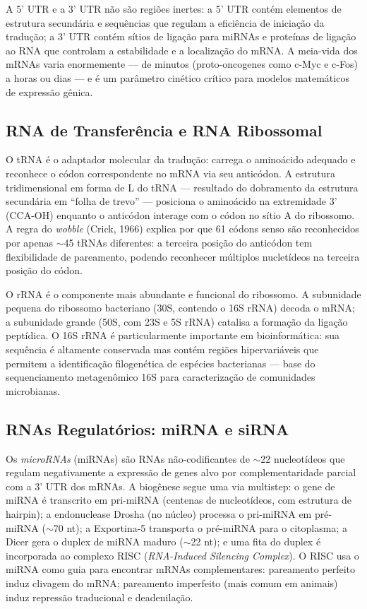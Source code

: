 A 5' UTR e a 3' UTR não são regiões inertes: a 5' UTR contém elementos de estrutura
secundária e sequências que regulam a eficiência de iniciação da tradução; a 3' UTR
contém sítios de ligação para miRNAs e proteínas de ligação ao RNA que controlam a
estabilidade e a localização do mRNA. A meia-vida dos mRNAs varia enormemente --- de
minutos (proto-oncogenes como c-Myc e c-Fos) a horas ou dias --- e é um parâmetro
cinético crítico para modelos matemáticos de expressão gênica.

\subsection{RNA de Transferência e RNA Ribossomal}

O tRNA é o adaptador molecular da tradução: carrega o aminoácido adequado e reconhece o
códon correspondente no mRNA via seu anticódon. A estrutura tridimensional em forma de
L do tRNA --- resultado do dobramento da estrutura secundária em ``folha de trevo'' ---
posiciona o aminoácido na extremidade 3' (CCA-OH) enquanto o anticódon interage com o
códon no sítio A do ribossomo. A regra do \emph{wobble} (Crick, 1966) explica por que 61
códons senso são reconhecidos por apenas $\sim$45 tRNAs diferentes: a terceira posição do
anticódon tem flexibilidade de pareamento, podendo reconhecer múltiplos nucletídeos na
terceira posição do códon.

O rRNA é o componente mais abundante e funcional do ribossomo. A subunidade pequena do
ribossomo bacteriano (30S, contendo o 16S rRNA) decoda o mRNA; a subunidade grande (50S,
com 23S e 5S rRNA) catalisa a formação da ligação peptídica. O 16S rRNA é particularmente
importante em bioinformática: sua sequência é altamente conservada mas contém regiões
hipervariáveis que permitem a identificação filogenética de espécies bacterianas ---
base do sequenciamento metagenômico 16S para caracterização de comunidades microbianas.

\subsection{RNAs Regulatórios: miRNA e siRNA}

Os \emph{microRNAs} (miRNAs) são RNAs não-codificantes de $\sim$22 nucleotídeos que
regulam negativamente a expressão de genes alvo por complementaridade parcial com a 3'
UTR dos mRNAs. A biogênese segue uma via multistep: o gene de miRNA é transcrito em
pri-miRNA (centenas de nucleotídeos, com estrutura de hairpin); a endonuclease Drosha
(no núcleo) processa o pri-miRNA em pré-miRNA ($\sim$70 nt); a Exportina-5 transporta o
pré-miRNA para o citoplasma; a Dicer gera o duplex de miRNA maduro ($\sim$22 nt); e uma
fita do duplex é incorporada ao complexo RISC (\textit{RNA-Induced Silencing Complex}).
O RISC usa o miRNA como guia para encontrar mRNAs complementares: pareamento perfeito
induz clivagem do mRNA; pareamento imperfeito (mais comum em animais) induz repressão
traducional e deadenilação.


